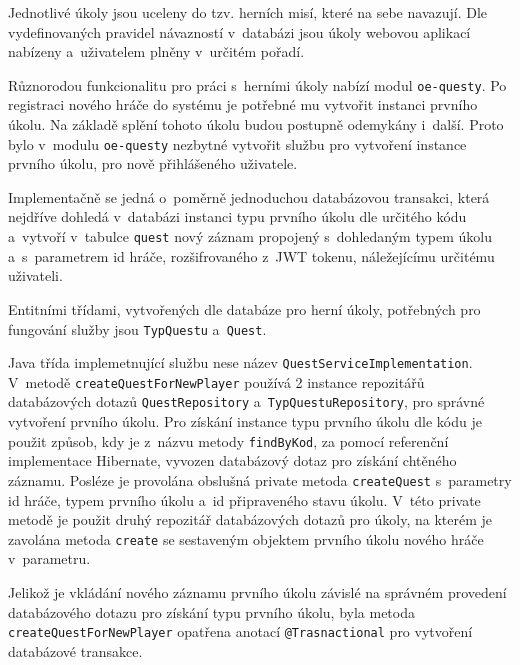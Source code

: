 \documentclass[12pt]{article}
\begin{document}
Jednotlivé úkoly jsou uceleny do tzv. herních misí, které na sebe navazují. Dle vydefinovaných pravidel návazností v~databázi jsou úkoly webovou aplikací nabízeny a~uživatelem plněny v~určitém pořadí.

Různorodou funkcionalitu pro práci s~herními úkoly nabízí modul \texttt{oe-questy}.
Po registraci nového hráče do systému je potřebné mu vytvořit instanci prvního úkolu. Na základě splění tohoto úkolu budou postupně odemykány i~další. 
Proto bylo v~modulu \texttt{oe-questy} nezbytné vytvořit službu pro vytvoření instance prvního úkolu, pro nově přihlášeného uživatele. 

Implementačně se jedná o~poměrně jednoduchou databázovou transakci, která nejdříve dohledá v~databázi instanci typu prvního úkolu dle určitého kódu a~vytvoří v~tabulce \texttt{quest} nový záznam propojený s~dohledaným typem úkolu a~s~parametrem id hráče, rozšifrovaného z~JWT tokenu, náležejícímu určitému uživateli.


Entitními třídami, vytvořených dle databáze pro herní úkoly, potřebných pro fungování služby jsou \texttt{TypQuestu} a~\texttt{Quest}.


\obrazek
{}


Java třída implemetnující službu nese název \texttt{QuestServiceImplementation}.
V~metodě \texttt{createQuestForNewPlayer} používá 2 instance repozitářů databázových dotazů \texttt{QuestRepository} a~\texttt{TypQuestuRepository}, pro správné vytvoření prvního úkolu. Pro získání instance typu prvního úkolu dle kódu je použit způsob, kdy je z~názvu metody \texttt{findByKod}, za pomocí referenční implementace Hibernate, vyvozen databázový dotaz pro získání chtěného záznamu. Posléze je provolána obslušná private metoda \texttt{createQuest} s~parametry id hráče, typem prvního úkolu a~id připraveného stavu úkolu. V~této private metodě je použit druhý repozitář databázových dotazů pro úkoly, na kterém je zavolána metoda \texttt{create} se sestaveným objektem prvního úkolu nového hráče v~parametru.

Jelikož je vkládání nového záznamu prvního úkolu závislé na správném provedení databázového dotazu pro získání typu prvního úkolu, byla metoda\texttt{ createQuestForNewPlayer} opatřena anotací \texttt{@Trasnactional} pro vytvoření databázové transakce.
\end{document}
